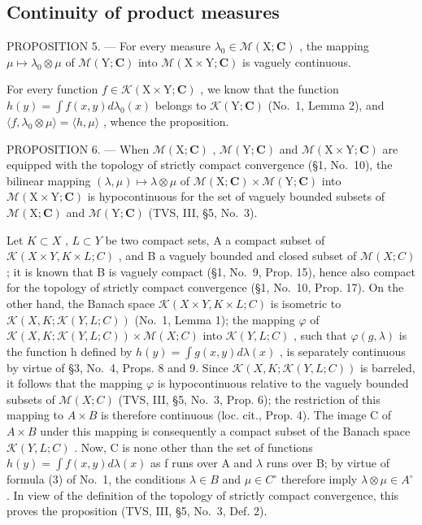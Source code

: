 \subsection{Continuity of product measures}

PROPOSITION 5. --- For every measure \(\lambda_0 \in \mathcal{M}(\mathrm{X};\mathbf{C})\) , the mapping \(\mu \mapsto \lambda_0 \otimes \mu\) of \(\mathcal{M}(\mathrm{Y};\mathbf{C})\) into \(\mathcal{M}(\mathrm{X} \times \mathrm{Y};\mathbf{C})\) is vaguely continuous.

For every function \(f \in \mathcal{K}(\mathrm{X} \times \mathrm{Y}; \mathbf{C})\) , we know that the function \(h(y) = \int f(x, y) d\lambda_0(x)\) belongs to \(\mathcal{K}(\mathrm{Y}; \mathbf{C})\) (No.~1, Lemma 2), and \(\langle f, \lambda_0 \otimes \mu \rangle = \langle h, \mu \rangle\) , whence the proposition.

PROPOSITION 6. --- When \(\mathcal{M}(\mathrm{X};\mathbf{C})\) , \(\mathcal{M}(\mathrm{Y};\mathbf{C})\) and \(\mathcal{M}(\mathrm{X}\times\mathrm{Y};\mathbf{C})\) are equipped with the topology of strictly compact convergence (§1, No.~10), the bilinear mapping \((\lambda,\mu)\mapsto\lambda\otimes\mu\) of \(\mathcal{M}(\mathrm{X};\mathbf{C})\times\mathcal{M}(\mathrm{Y};\mathbf{C})\) into \(\mathcal{M}(\mathrm{X}\times\mathrm{Y};\mathbf{C})\) is hypocontinuous for the set of vaguely bounded subsets of \(\mathcal{M}(\mathrm{X};\mathbf{C})\) and \(\mathcal{M}(\mathrm{Y};\mathbf{C})\) (TVS, III, §5, No.~3).

Let \(K \subset X\) , \(L \subset Y\) be two compact sets, A a compact subset of \(\mathcal{K}(X \times Y, K \times L; C)\) , and B a vaguely bounded and closed subset of \(\mathcal{M}(X; C)\) ; it is known that B is vaguely compact (§1, No.~9, Prop. 15), hence also compact for the topology of strictly compact convergence (§1, No.~10, Prop. 17). On the other hand, the Banach space \(\mathcal{K}(X \times Y, K \times L; C)\) is isometric to \(\mathcal{K}(X, K; \mathcal{K}(Y, L; C))\) (No.~1, Lemma 1); the mapping \(\varphi\) of \(\mathcal{K}(X, K; \mathcal{K}(Y, L; C)) \times \mathcal{M}(X; C)\) into \(\mathcal{K}(Y, L; C)\) , such that \(\varphi(g, \lambda)\) is the function h defined by \(h(y) = \int g(x, y) d\lambda(x)\) , is separately continuous by virtue of §3, No.~4, Props. 8 and 9. Since \(\mathcal{K}(X, K; \mathcal{K}(Y, L; C))\) is barreled, it follows that the mapping \(\varphi\) is hypocontinuous relative to the vaguely bounded subsets of \(\mathcal{M}(X; C)\) (TVS, III, §5, No.~3, Prop. 6); the restriction of this mapping to \(A \times B\) is therefore continuous (loc. cit., Prop. 4). The image C of \(A \times B\) under this mapping is consequently a compact subset of the Banach space \(\mathcal{K}(Y, L; C)\) . Now, C is none other than the set of functions \(h(y) = \int f(x, y) d\lambda(x)\) as f runs over A and \(\lambda\) runs over B; by virtue of formula (3) of No.~1, the conditions \(\lambda \in B\) and \(\mu \in C^{\circ}\) therefore imply \(\lambda \otimes \mu \in A^{\circ}\) . In view of the definition of the topology of strictly compact convergence, this proves the proposition (TVS, III, §5, No.~3, Def. 2).

